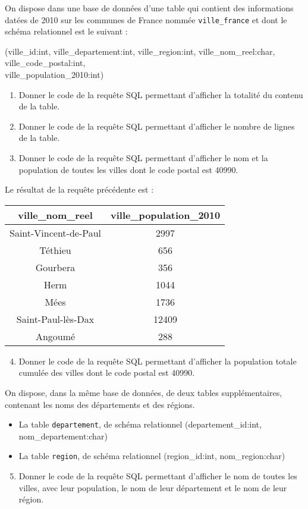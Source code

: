 On dispose dans une base de données d'une table qui contient des informations datées de 2010 sur les communes de France nommée \verb|ville_france| et dont le schéma relationnel est le suivant :

(ville\_id:int, ville\_departement:int, ville\_region:int, ville\_nom\_reel:char, ville\_code\_postal:int,\\
ville\_population\_2010:int)

\begin{enumerate}
 \item Donner le code de la requête SQL permettant d'afficher la totalité du contenu de la table.
 \item Donner le code de la requête SQL permettant d'afficher le nombre de lignes de la table.
 \item Donner le code de la requête SQL permettant d'afficher le nom et la population de toutes les villes dont le code postal est 40990.
\end{enumerate}

Le résultat de la requête précédente est :

\begin{center}
\begin{tabular}{|c|c|}
\hline
\textbf{ville\_nom\_reel} & \textbf{ville\_population\_2010} \\
\hline
Saint-Vincent-de-Paul & 2997 \\
\hline
Téthieu & 656 \\
\hline
Gourbera & 356 \\
\hline
Herm & 1044 \\
\hline
Mées & 1736 \\
\hline
Saint-Paul-lès-Dax & 12409 \\
\hline
Angoumé & 288 \\
\hline
\end{tabular}
\end{center}

\begin{enumerate}
\setcounter{enumi}{3}
 \item Donner le code de la requête SQL permettant d'afficher la population totale cumulée des villes dont le code postal est 40990.
\end{enumerate}

On dispose, dans la même base de données, de deux tables supplémentaires, contenant les noms des départements et des régions.
\begin{itemize}
 \item La table \verb|departement|, de schéma relationnel (departement\_id:int, nom\_departement:char)
 \item La table \verb|region|, de schéma relationnel (region\_id:int, nom\_region:char)
\end{itemize}

\begin{enumerate}
\setcounter{enumi}{4}
 \item Donner le code de la requête SQL permettant d'afficher le nom de toutes les villes, avec leur population, le nom de leur département et le nom de leur région.
\end{enumerate}


